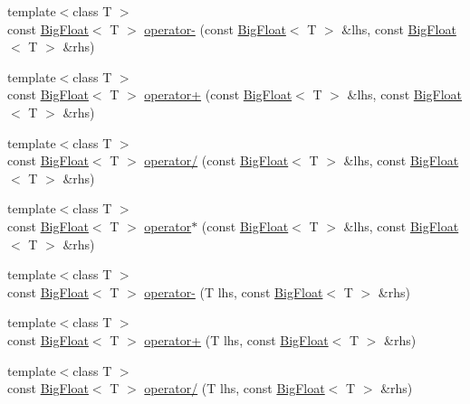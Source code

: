 \begin{DoxyCompactItemize}
\item 
{\footnotesize template$<$class T $>$ }\\const \hyperlink{classatl_1_1_big_float}{Big\+Float}$<$ T $>$ \hyperlink{namespaceatl_afd5c24f3de322ec3622dec085fb486e9}{operator-\/} (const \hyperlink{classatl_1_1_big_float}{Big\+Float}$<$ T $>$ \&lhs, const \hyperlink{classatl_1_1_big_float}{Big\+Float}$<$ T $>$ \&rhs)
\item 
{\footnotesize template$<$class T $>$ }\\const \hyperlink{classatl_1_1_big_float}{Big\+Float}$<$ T $>$ \hyperlink{namespaceatl_a1c562132c598e2874708b62460365ee2}{operator+} (const \hyperlink{classatl_1_1_big_float}{Big\+Float}$<$ T $>$ \&lhs, const \hyperlink{classatl_1_1_big_float}{Big\+Float}$<$ T $>$ \&rhs)
\item 
{\footnotesize template$<$class T $>$ }\\const \hyperlink{classatl_1_1_big_float}{Big\+Float}$<$ T $>$ \hyperlink{namespaceatl_a358aa906d4f7853544d80b68a358d535}{operator/} (const \hyperlink{classatl_1_1_big_float}{Big\+Float}$<$ T $>$ \&lhs, const \hyperlink{classatl_1_1_big_float}{Big\+Float}$<$ T $>$ \&rhs)
\item 
{\footnotesize template$<$class T $>$ }\\const \hyperlink{classatl_1_1_big_float}{Big\+Float}$<$ T $>$ \hyperlink{namespaceatl_ae2d902c6fc820d14a483f23d81a592fb}{operator$\ast$} (const \hyperlink{classatl_1_1_big_float}{Big\+Float}$<$ T $>$ \&lhs, const \hyperlink{classatl_1_1_big_float}{Big\+Float}$<$ T $>$ \&rhs)
\item 
{\footnotesize template$<$class T $>$ }\\const \hyperlink{classatl_1_1_big_float}{Big\+Float}$<$ T $>$ \hyperlink{namespaceatl_a25f2b68d0223ce171b3ab57016c625cd}{operator-\/} (T lhs, const \hyperlink{classatl_1_1_big_float}{Big\+Float}$<$ T $>$ \&rhs)
\item 
{\footnotesize template$<$class T $>$ }\\const \hyperlink{classatl_1_1_big_float}{Big\+Float}$<$ T $>$ \hyperlink{namespaceatl_a69c419e607c97be8fd04441ba063ebfa}{operator+} (T lhs, const \hyperlink{classatl_1_1_big_float}{Big\+Float}$<$ T $>$ \&rhs)
\item 
{\footnotesize template$<$class T $>$ }\\const \hyperlink{classatl_1_1_big_float}{Big\+Float}$<$ T $>$ \hyperlink{namespaceatl_ad3f2b87786d532344bce55c77430550f}{operator/} (T lhs, const \hyperlink{classatl_1_1_big_float}{Big\+Float}$<$ T $>$ \&rhs)

\end{DoxyCompactItemize}
